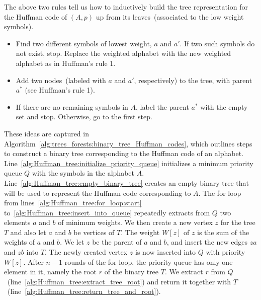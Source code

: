 The above two rules tell us how to inductively build the tree
representation for the Huffman code of $(A,p)$ up from its
leaves~(associated to the low weight symbols).
%
\begin{itemize}
\item Find two different symbols of lowest weight, $a$ and $a'$. If
  two such symbols do not exist, stop. Replace the weighted alphabet
  with the new weighted alphabet as in Huffman's rule 1.

\item Add two nodes~(labeled with $a$ and $a'$, respectively) to the
  tree, with parent $a^*$ (see Huffman's rule 1).

\item If there are no remaining symbols in $A$, label the parent $a^*$
  with the empty set and stop. Otherwise, go to the first step.
\end{itemize}

These ideas are captured in
Algorithm~\ref{alg:trees_forests:binary_tree_Huffman_codes}, which
outlines steps to construct a binary tree corresponding to the Huffman
code of an alphabet.
Line~\ref{alg:Huffman_tree:initialize_priority_queue} initializes a
minimum priority queue $Q$ with the symbols in the alphabet $A$.
Line~\ref{alg:Huffman_tree:empty_binary_tree} creates an empty binary
tree that will be used to represent the Huffman code corresponding to
$A$. The for loop from lines~\ref{alg:Huffman_tree:for_loop:start}
to~\ref{alg:Huffman_tree:insert_into_queue} repeatedly extracts from
$Q$ two elements $a$ and $b$ of minimum weights. We then create a new
vertex $z$ for the tree $T$ and also let $a$ and $b$ be vertices of
$T$. The weight $W[z]$ of $z$ is the sum of the weights of $a$ and
$b$. We let $z$ be the parent of $a$ and $b$, and insert the new edges
$za$ and $zb$ into $T$. The newly created vertex $z$ is now inserted
into $Q$ with priority $W[z]$. After $n - 1$ rounds of the for loop,
the priority queue has only one element in it, namely the root $r$ of
the binary tree $T$. We extract $r$ from
$Q$~(line~\ref{alg:Huffman_tree:extract_tree_root}) and return it
together with $T$~(line~\ref{alg:Huffman_tree:return_tree_and_root}).

